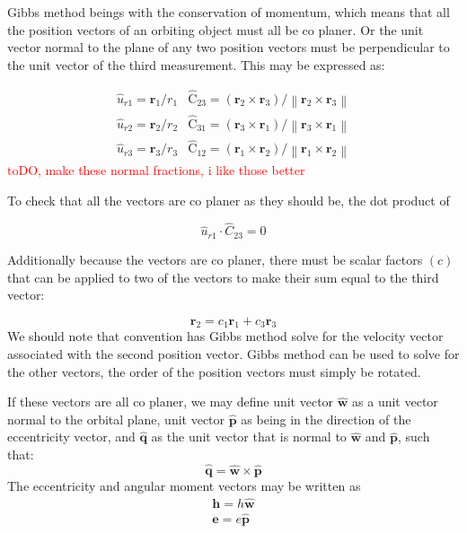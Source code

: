 \documentclass[12pt]{article}
\begin{document}
	Gibbs method beings with the conservation of momentum, which means that all the position vectors of an orbiting object must all be co planer. Or the unit vector normal to the plane of any two position vectors must be perpendicular to the unit vector of the third measurement. This may be expressed as:
	
	\begin{eqnarray}
	\hat { { u } } _ { r 1 } = \mathbf { r } _ { 1 } / r _ { 1 }& \hat { \mathrm { C } } _ { 23 } = \left( \mathbf { r } _ { 2 } \times \mathbf { r } _ { 3 } \right) / \left\| \mathbf { r } _ { 2 } \times \mathbf { r } _ { 3 } \right\|\\
	\hat {{ u } } _ { r 2 } = \mathbf { r } _ { 2 } / r _ { 2 }&\hat { \mathrm { C } } _ { 31 } = \left( \mathbf { r } _ { 3 } \times \mathbf { r } _ { 1} \right) / \left\| \mathbf { r } _ { 3 } \times \mathbf { r } _ { 1 } \right\|\\
	\hat {{ u } } _ { r 3 } = \mathbf { r } _ { 3 } / r _ { 3} & \hat { \mathrm { C } } _ { 12 } = \left( \mathbf { r } _ { 1 } \times \mathbf { r } _ { 2 } \right) / \left\| \mathbf { r } _ { 1} \times \mathbf { r } _ { 2 } \right\|
	\end{eqnarray}
	\textcolor{red}{toDO, make these normal fractions, i like those better}
	
	To check that all the vectors are co planer as they should be, the dot product of 
	
	\begin{equation}
	\hat {  { u } } _ { r 1 } \cdot \hat {  { C } } _ { 23 } = 0
	\end{equation}
	
	Additionally because the vectors are co planer, there must be scalar factors $(c)$ that can be applied to two of the vectors to make their sum equal to the third vector:
	
	\begin{equation}
	\mathbf{r}_2 = c_1 \mathbf{ r }_1 + c_3 \mathbf{r}_3
	\label{eqn:cs}
	\end{equation}
	We should note that convention has Gibbs method solve for the velocity vector associated with the second position vector. Gibbs method can be used to solve for the other vectors, the order of the position vectors must simply be rotated.
	
		
	If these vectors are all co planer, we may define unit vector $\hat{\mathbf{w}}$ as a unit vector normal to the orbital plane, unit vector $\hat{\mathbf{p}}$ as being in the direction of the eccentricity vector, and $\hat{\mathbf{q}}$ as the unit vector that is normal to $\hat{\mathbf{w}}$ and $\hat{\mathbf{p}}$, such that:
	\begin{equation}
	\hat{\mathbf{q}}=\hat{\mathbf{w}}\times\hat{\mathbf{p}}
	\label{eqn:cross_wpq}
	\end{equation}
	The eccentricity and angular moment vectors may be written as 
	\begin{eqnarray}
	\mathbf{h}=h\hat{\mathbf{w}}\\
	\mathbf{e}=e\hat{\mathbf{p}}
	\end{eqnarray}
	
\end{document}
